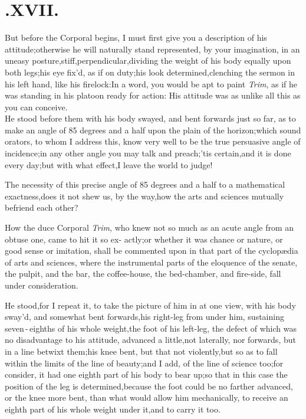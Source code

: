 \documentclass{article}
\begin{document}
\section{.\enspace  XVII.}

\quad\tsh But before the Corporal
begins, I must first give you a description of his
attitude;\tsh otherwise he will naturally stand
represented, by your imagination, in an uneasy
posture,\tsk stiff,\tsk perpendi\-cular,\tsk dividing the
weight of his body equally upon both legs;\tsh his eye fix’d,
as if on duty;\tsk his look determined,\tsk\break clenching the
sermon in his left hand, like his firelock:\tsk In a word,
you would be apt to paint \textit{Trim}, as if he was standing in his
platoon ready for action:\tsh\break
His attitude was as unlike all this as you\break
can conceive.\\
\newpage
He stood before them with his body swayed, and bent forwards
just so far, as to make an angle of 85 degrees and a half upon the
plain of the horizon;\tsh\break which sound orators, to whom I address
this, know very well to be the true persuasive angle of
incidence;\tsk in any other angle you may talk and
preach;\tsk ’tis certain,\tsk and it is done every
day;\tsk\break but with what effect,\tsk I leave the world to
judge!

The necessity of this precise angle of 85 degrees and a half to
a mathematical exactness,\tsh does it not shew us, by the
way,\tsk how the arts and sciences mutually befriend each other?

How the duce Corporal \textit{Trim}, who\break
knew not so much as an acute angle\break
from an obtuse one, came to hit it so ex-
actly;\tsh or whether it was chance or nature, or good
sense or imitation, \etc\break shall be commented upon in that part of
the cyclopædia of arts and sciences, where the instrumental
parts of the eloquence of the senate, the pulpit, and the bar, the
coffee-house, the bed-chamber, and fire-side, fall under
consideration.

He stood,\tsh for I repeat it, to take the picture of
him in at one view, with his body sway’d, and somewhat bent
forwards,\tsk his right-leg from under him, sustaining
seven\,-\,eighths of his whole\break
weight,\tsk the foot of his
left-leg, the defect of which was no disadvantage to his attitude,
advanced a little,\tsk not laterally, nor forwards, but in a line
betwixt them;\tsk his knee bent, but that not
violently,\tsk but so as to fall within the limits of the line of
beauty;\tsk and I add,
of the line of science too;\tsk for
consider, it had one eighth part of his body to bear up;\tsk so
that in this case the position of the leg is
determined,\tsk because the foot could be no farther advanced, or
the knee more bent, than what would allow him mechanically,
to receive an eighth part of his whole weight under\break
it,\tsk and to carry it too.
\end{document}
